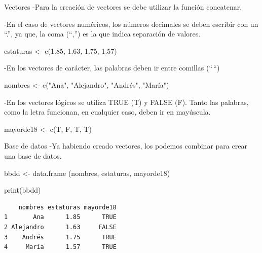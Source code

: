 \documentclass[
  30pt,
  ignorenonframetext,
]{beamer}
\newenvironment{Shaded}{\begin{snugshade}}{\end{snugshade}}
\newcommand{\FloatTok}[1]{\textcolor[rgb]{0.68,0.00,0.00}{#1}}
\newcommand{\FunctionTok}[1]{\textcolor[rgb]{0.28,0.35,0.67}{#1}}
\newcommand{\NormalTok}[1]{\textcolor[rgb]{0.00,0.23,0.31}{#1}}
\newcommand{\OtherTok}[1]{\textcolor[rgb]{0.00,0.23,0.31}{#1}}
\newcommand{\StringTok}[1]{\textcolor[rgb]{0.13,0.47,0.30}{#1}}
\begin{document}
\begin{frame}[fragile]{Vectores}
\label{vectores-1}
-Para la creación de vectores se debe utilizar la función concatenar.

-En el caso de vectores numéricos, los números decimales se deben
escribir con un ``.'', ya que, la coma (``,'') es la que indica
separación de valores.

\begin{Shaded}
\begin{Highlighting}[]
\NormalTok{estaturas }\OtherTok{\textless{}{-}} \FunctionTok{c}\NormalTok{(}\FloatTok{1.85}\NormalTok{, }\FloatTok{1.63}\NormalTok{, }\FloatTok{1.75}\NormalTok{, }\FloatTok{1.57}\NormalTok{)}
\end{Highlighting}
\end{Shaded}

-En los vectores de carácter, las palabras deben ir entre comillas
(``\,``)

\begin{Shaded}
\begin{Highlighting}[]
\NormalTok{nombres }\OtherTok{\textless{}{-}} \FunctionTok{c}\NormalTok{(}\StringTok{"Ana"}\NormalTok{, }\StringTok{"Alejandro"}\NormalTok{, }\StringTok{"Andrés"}\NormalTok{, }\StringTok{"María"}\NormalTok{)}
\end{Highlighting}
\end{Shaded}

-En los vectores lógicos se utiliza TRUE (T) y FALSE (F). Tanto las
palabras, como la letra funcionan, en cualquier caso, deben ir en
mayúscula.

\begin{Shaded}
\begin{Highlighting}[]
\NormalTok{mayorde18 }\OtherTok{\textless{}{-}} \FunctionTok{c}\NormalTok{(T, F, T, T)}
\end{Highlighting}
\end{Shaded}
\end{frame}

\begin{frame}[fragile]{Base de datos}
\label{base-de-datos}
-Ya habiendo creado vectores, los podemos combinar para crear una base
de datos.

\begin{Shaded}
\begin{Highlighting}[]
\NormalTok{bbdd }\OtherTok{\textless{}{-}} \FunctionTok{data.frame}\NormalTok{ (nombres, estaturas, mayorde18)}

\FunctionTok{print}\NormalTok{(bbdd)}
\end{Highlighting}
\end{Shaded}

\begin{verbatim}
    nombres estaturas mayorde18
1       Ana      1.85      TRUE
2 Alejandro      1.63     FALSE
3    Andrés      1.75      TRUE
4     María      1.57      TRUE
\end{verbatim}
\end{frame}
\end{document}

